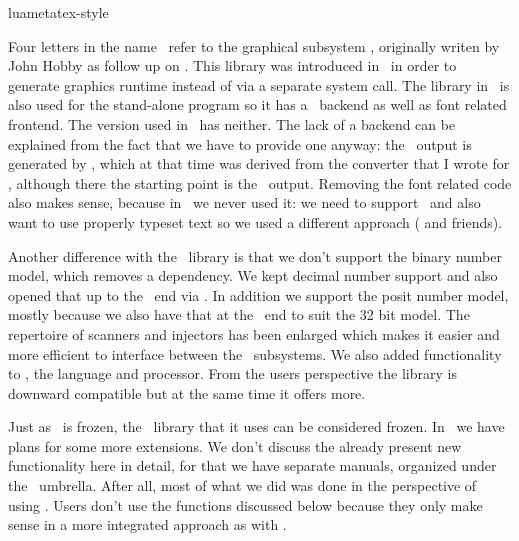 
\environment luametatex-style

\startdocument[title=Metapost]

\startsection[title={Introduction}]

Four letters in the name \LUAMETATEX\ refer to the graphical subsystem \METAPOST,
originally writen by John Hobby as follow up on \METAFONT. This library was
introduced in \LUATEX\ in order to generate graphics runtime instead of via a
separate system call. The library in \LUATEX\ is also used for the stand-alone
program so it has a \POSTSCRIPT\ backend as well as font related frontend. The
version used in \LUAMETATEX\ has neither. The lack of a backend can be explained
from the fact that we have to provide one anyway: the \PDF\ output is generated
by \LUA, which at that time was derived from the converter that I wrote for
\PDFTEX, although there the starting point is the \POSTSCRIPT\ output. Removing
the font related code also makes sense, because in \MKIV\ we never used it: we
need to support \OPENTYPE\ and also want to use properly typeset text so we used
a different approach ( and friends).

Another difference with the \LUATEX\ library is that we don't support the binary
number model, which removes a dependency. We kept decimal number support and also
opened that up to the \TEX\ end via \LUA. In addition we support the posit number
model, mostly because we also have that at the \TEX\ end to suit the 32 bit
model. The repertoire of scanners and injectors has been enlarged which makes it
easier and more efficient to interface between the \LUAMETATEX\ subsystems. We
also added functionality to \METAPOST, the language and processor. From the users
perspective the library is downward compatible but at the same time it offers
more.

Just as \LUATEX\ is frozen, the \METAPOST\ library that it uses can be considered
frozen. In \LUAMETATEX\ we have plans for some more extensions. We don't discuss
the already present new functionality here in detail, for that we have separate
manuals, organized under the \LUAMETAFUN\ umbrella. After all, most of what we
did was done in the perspective of using \CONTEXT. Users don't use the functions
discussed below because they only make sense in a more integrated approach as
with \LUAMETAFUN.

\stopsection

\startsection[title={Instances}]

